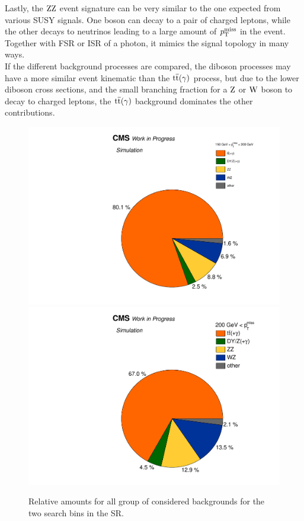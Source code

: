 Lastly, the $\mathrm{Z}\mathrm{Z}$ event signature can be very similar to the one expected from various SUSY signals. One boson can decay to a pair of charged leptons, while the other decays to neutrinos leading to a large amount of $p_{\mathrm{T}}^\text{miss}$ in the event. Together with FSR or ISR of a photon, it mimics the signal topology in many ways.\\
If the different background processes are compared, the diboson processes may have a more similar event kinematic than the ${\mathrm{t}\overline{\mathrm{t}}}(\gamma)$ process, but due to the lower diboson cross sections, and the small branching fraction for a $\mathrm{Z}$ or $\mathrm{W}$ boson to decay to charged leptons, the ${\mathrm{t}\overline{\mathrm{t}}}(\gamma)$ background dominates the other contributions.\\

\begin{figure}[tbp]
 \centering
 \includegraphics[width=\pairwidth]{figures/figures/pie1}
 \includegraphics[width=\pairwidth]{figures/figures/pie2}
 \caption{Relative amounts for all group of considered backgrounds for the two search bins in the SR.}
 \label{fig:PieCharts}
\end{figure}

